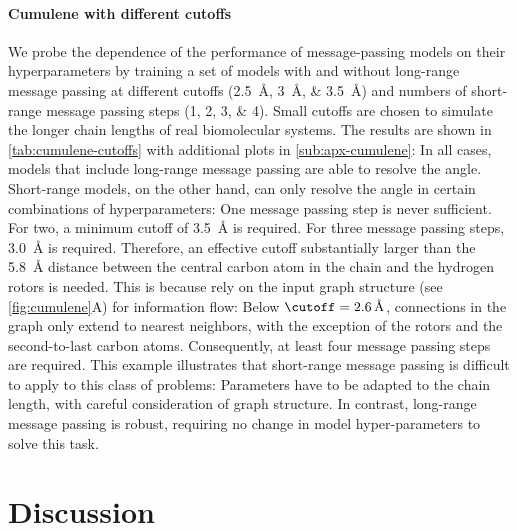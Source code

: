 \documentclass[10pt]{article}
\begin{document}
\paragraph{Cumulene with different cutoffs} We probe the dependence of the performance of message-passing models on their hyperparameters by training a set of \lorem models with and without long-range message passing at different cutoffs (\qtylist{2.5;3;3.5}{\angstrom}) and numbers of short-range message passing steps (\numlist{1;2;3;4}). Small cutoffs are chosen to simulate the longer chain lengths of real biomolecular systems.
The results are shown in \cref{tab:cumulene-cutoffs} with additional plots in \cref{sub:apx-cumulene}: In all cases, models that include long-range message passing are able to resolve the angle. Short-range models, on the other hand, can only resolve the angle in certain combinations of hyperparameters: One message passing step is never sufficient. For two, a minimum cutoff of \qty{3.5}{\angstrom} is required. For three message passing steps, \qty{3.0}{\angstrom} is required.
Therefore, an effective cutoff substantially larger than the \qty{5.8}{\angstrom} distance between the central carbon atom in the chain and the hydrogen rotors is needed.
This is because \mpnns rely on the input graph structure (see \cref{fig:cumulene}A) for information flow: Below $\cutoff=\qty{2.6}{\angstrom}$, connections in the graph only extend to nearest neighbors, with the exception of the rotors and the second-to-last carbon atoms. Consequently, at least four message passing steps are required.
This example illustrates that short-range message passing is difficult to apply to this class of problems: Parameters have to be adapted to the chain length, with careful consideration of graph structure. In contrast, long-range message passing is robust, requiring no change in model hyper-parameters to solve this task.

\begin{table}
    \centering
    \caption{Ability of different \lorem models, with and without long-range message passing and with different numbers of short-range message passing steps, to solve the cumulene benchmark task. A tick (\yes) indicates yes, a cross (\no) indicates no.  shows the full curves.}
    
    \label{tab:cumulene-cutoffs}
\end{table}




\section{Discussion}
\end{document}

